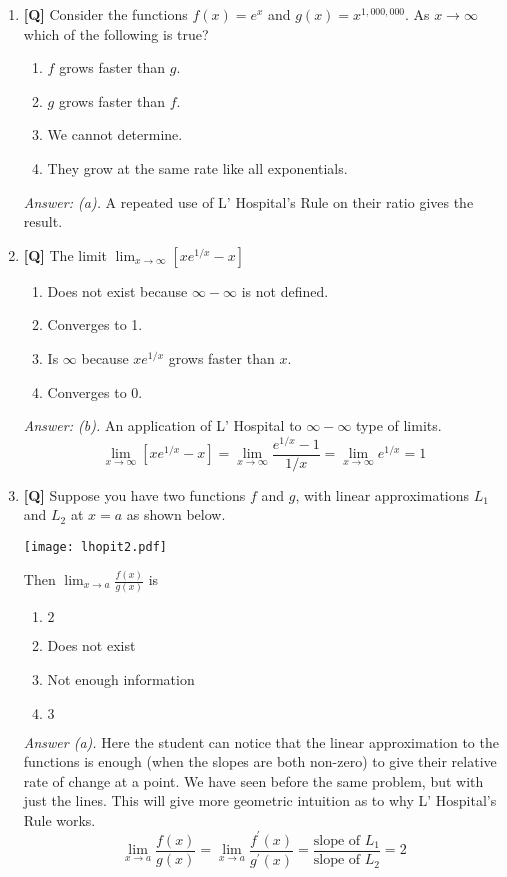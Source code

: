\documentclass[12pt]{article}
\begin{document}
\begin{enumerate}

\item {\bf [Q]} Consider the functions $f(x)=e^x$ and $g(x)=x^{1,000,000}$.
As $x\rightarrow\infty$ which of the following is true?
\begin{enumerate}
\item $f$ grows faster than $g$.
\item $g$ grows faster than $f$.
\item We cannot determine.
\item They grow at the same rate like all exponentials.
\end{enumerate}

{\it Answer: (a).} A repeated use of L' Hospital's Rule on their
ratio gives the result.

\bigskip

\item {\bf [Q]} The limit $\displaystyle{\lim_{x\to \infty}{[xe^{1/x}-x]}}$
\begin{enumerate}
\item Does not exist because $\infty-\infty$ is not defined.
\item Converges to 1.
\item Is $\infty$ because $xe^{1/x}$ grows faster than $x$.
\item Converges to 0.
\end{enumerate}

{\it Answer:  (b).} An application of L' Hospital to
$\infty-\infty$ type of limits. 
$$\displaystyle{\lim_{x\to \infty}{[xe^{1/x}-x]}=\lim_{x\to \infty}\frac{e^{1/x}-1}{1/x}=
\lim_{x\to \infty}e^{1/x}=1}$$

\bigskip

\item {\bf [Q]} Suppose you have two functions $f$ and $g$, with linear
approximations $L_1$ and $L_2$ at $x=a$ as shown below.

\begin{center}\texttt{[image: lhopit2.pdf]}\end{center}

Then $\displaystyle{\lim_{x\rightarrow a}\frac{f(x)}{g(x)}}$ is

\begin{enumerate}
\item $2$
\item Does not exist
\item Not enough information
\item $3$
\end{enumerate}

{\it Answer (a).} Here the student can notice that the linear
approximation to the functions is enough (when the slopes are both
non-zero) to give their relative rate of change at a point. We
have seen before the same problem, but with just the lines. This
will give more geometric intuition as to why L' Hospital's Rule
works. 
$$\lim_{x\rightarrow a}\frac{f(x)}{g(x)}=
\lim_{x\rightarrow a}\frac{f^{\prime} (x)}{g^{\prime}(x)}=
\frac{\mbox {slope of } L_1}{\mbox{slope of } L_2}=2$$

\end{enumerate}
\end{document}
